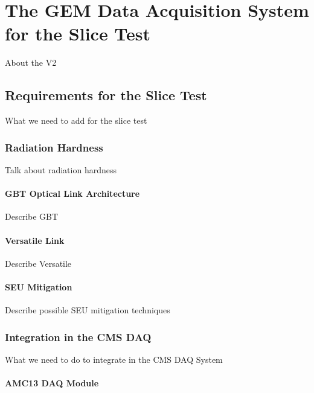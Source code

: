 \chapter{The GEM Data Acquisition System for the Slice Test}
\label{chap:gem_daq_slice_test}

    About the V2

    \section{Requirements for the Slice Test}

        What we need to add for the slice test

        \subsection{Radiation Hardness}

            Talk about radiation hardness

            \subsubsection{GBT Optical Link Architecture}

                Describe GBT

            \subsubsection{Versatile Link}

                Describe Versatile

            \subsubsection{SEU Mitigation}

                Describe possible SEU mitigation techniques

        \subsection{Integration in the CMS DAQ}

            What we need to do to integrate in the CMS DAQ System

            \subsubsection{AMC13 DAQ Module}

